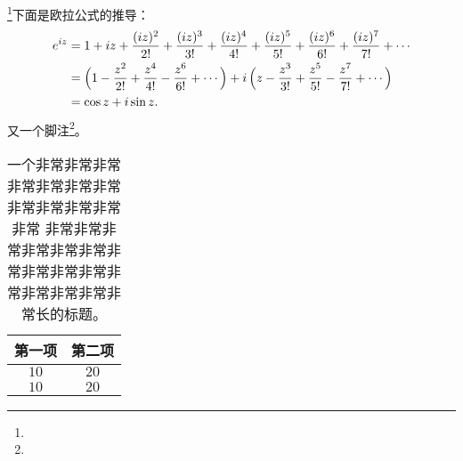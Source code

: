 \documentclass[UTF8,zihao=-4,no-math,a4paper]{ctexart}
\begin{document}
\zhlipsum*[1]\footnote{\zhlipsum*[2]}下面是欧拉公式的推导：
\begin{align}
e^{i z} & = 1 + i z + \frac{(i z)^2}{2!} + \frac{(i z)^3}{3!}
     + \frac{(i z)^4}{4!} + \frac{(i z)^5}{5!}
     + \frac{(i z)^6}{6!} + \frac{(i z)^7}{7!} + \dotsb \\
 & = \Bigl( 1 - \frac{z^2}{2!} + \frac{z^4}{4!}
       - \frac{z^6}{6!} + \dotsb \Bigr)
     + i \, \Bigl( z - \frac{z^3}{3!} + \frac{z^5}{5!}
       - \frac{z^7}{7!} + \dotsb \Bigr) \\
 & = \cos z + i \sin z.
\end{align}
又一个脚注\footnote{\zhlipsum*[3]}。
\begin{table}[ht]
\centering%
\caption[短标题]{一个非常非常非常非常非常非常非常非常非常非常非常非常
  非常非常非常非常非常非常非常非常非常非常非常非常非常非常非常长的标题。}
\begin{tabular}{c c}
\toprule
第一项 & 第二项 \\
\midrule
 $10$ & $20$ \\
 $10$ & $20$ \\
\bottomrule
\end{tabular}
\end{table}
\zhlipsum[4]
\begin{singlespace}
\blindtext
\end{singlespace}
\zhlipsum[5]
\end{document}
